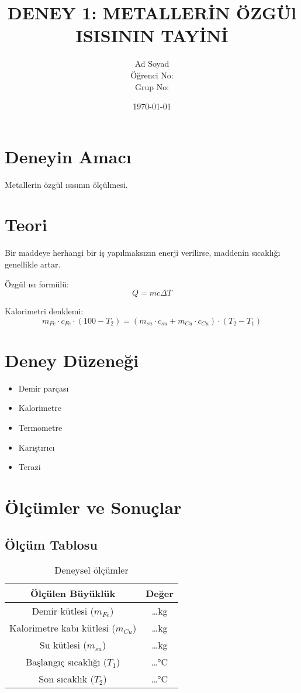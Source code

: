 \documentclass[12pt,a4paper]{article}
\title{DENEY 1: METALLERİN ÖZGÜl ISISININ TAYİNİ}
\author{Ad Soyad \\ Öğrenci No: \\ Grup No: }
\date{\today}
\begin{document}
\maketitle

\section{Deneyin Amacı}
Metallerin özgül ısısının ölçülmesi.

\section{Teori}
Bir maddeye herhangi bir iş yapılmaksızın enerji verilirse, maddenin sıcaklığı genellikle artar. 

Özgül ısı formülü:
\begin{equation}
Q = mc\Delta T
\end{equation}

Kalorimetri denklemi:
\begin{equation}
m_{Fe} \cdot c_{Fe} \cdot (100 - T_2) = (m_{su} \cdot c_{su} + m_{Cu} \cdot c_{Cu}) \cdot (T_2 - T_1)
\end{equation}

\section{Deney Düzeneği}
\begin{itemize}
    \item Demir parçası
    \item Kalorimetre
    \item Termometre
    \item Karıştırıcı
    \item Terazi
\end{itemize}

\section{Ölçümler ve Sonuçlar}

\subsection{Ölçüm Tablosu}
\begin{table}[H]
\centering
\begin{tabular}{|c|c|}
\hline
Ölçülen Büyüklük & Değer \\
\hline
Demir kütlesi ($m_{Fe}$) & \ldots kg \\
Kalorimetre kabı kütlesi ($m_{Cu}$) & \ldots kg \\
Su kütlesi ($m_{su}$) & \ldots kg \\
Başlangıç sıcaklığı ($T_1$) & \ldots °C \\
Son sıcaklık ($T_2$) & \ldots °C \\
\hline
\end{tabular}
\caption{Deneysel ölçümler}
\end{table}
\end{document}
